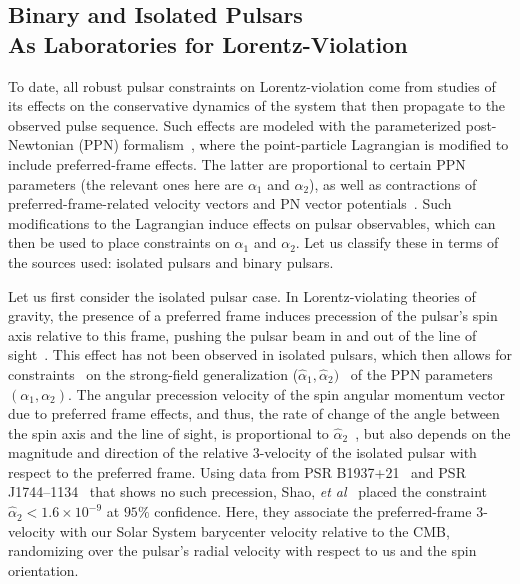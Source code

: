 \documentclass[prd,aps,twocolumn,nofootinbib,showpacs,superscriptaddress]{revtex4-1}
\begin{document}
\subsection{Binary and Isolated Pulsars \\ As Laboratories for Lorentz-Violation}


To date, all robust pulsar constraints on Lorentz-violation come from studies of its effects on the conservative dynamics of the system that then propagate to the observed pulse sequence. Such effects are modeled with the parameterized post-Newtonian (PPN) formalism~\cite{nordvedt,Nordtvedt:1968qs,1972ApJ...177..757W,1972ApJ...177..775N,1971ApJ...163..611W,1973ApJ...185...31W}, where the point-particle Lagrangian is modified to include preferred-frame effects. The latter are proportional to certain PPN parameters (the relevant ones here are $\alpha_{1}$ and $\alpha_{2}$), as well as contractions of preferred-frame-related velocity vectors and PN vector potentials~\cite{TEGP,will-living}. Such modifications to the Lagrangian induce effects on pulsar observables, which can then be used to place constraints on $\alpha_{1}$ and $\alpha_{2}$. Let us classify these in terms of the sources used: isolated pulsars and binary pulsars. 

Let us first consider the isolated pulsar case. In Lorentz-violating theories of gravity, the presence of a preferred frame
induces precession of the pulsar's spin axis relative to this frame, pushing the pulsar beam in and out of the line of sight~\cite{1987ApJ...320..871N,Damour:1992ah}.  This effect has not been observed in isolated pulsars, which then allows for constraints~\cite{Shao:2013wga} on the strong-field generalization ($\hat{\alpha}_{1},\hat{\alpha}_{2})$~\cite{Damour:1992ah} of the PPN parameters $(\alpha_{1},\alpha_{2})$. The angular precession velocity of the spin angular momentum vector due to preferred frame effects, and thus, the rate of change  of the angle between the spin axis and the line of sight, is proportional to $\hat{\alpha}_{2}$~\cite{1987ApJ...320..871N,Damour:1992ah}, but also depends on the magnitude and direction of the relative 3-velocity of the isolated pulsar with respect to the preferred frame. Using data from PSR B1937+21~\cite{Rutledge:2003xk} and PSR J1744--1134~\cite{1997ApJ...481..386B} that shows no such precession, Shao, {\textit{et al}}~\cite{Shao:2013wga} placed the constraint $\hat{
\alpha}_{2} < 1.6 \times 10^{-9}$ at $95\%$ confidence. Here, they associate the preferred-frame 3-velocity with  our Solar System barycenter velocity relative to the CMB, randomizing over the pulsar's radial velocity with respect to us and the spin orientation. 
\end{document}
